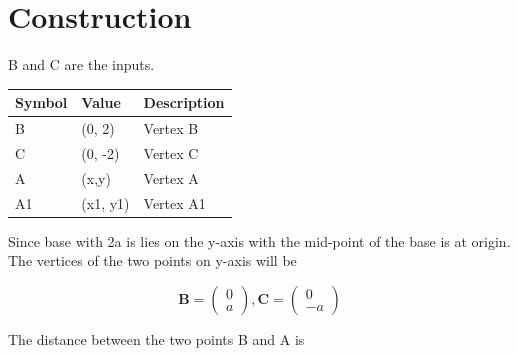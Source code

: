 \documentclass[journal,12pt,twocolumn]{IEEEtran}
\let\vec\mathbf
\newcommand{\myvec}[1]{\ensuremath{\begin{pmatrix}#1\end{pmatrix}}}
\begin{document}
\section{Construction}
B and C are the inputs.
\begin{table}[h]
\centering
\large
\begin{tabular}{|l|l|l|}
\hline
\textbf{Symbol} & \textbf{Value} & \textbf{Description} \\ \hline
B               & (0, 2)         & Vertex B             \\ \hline
C               & (0, -2)        & Vertex C             \\ \hline
A               & (x,y)          & Vertex A             \\ \hline
A1              & (x1, y1)       & Vertex A1            \\ \hline
\end{tabular}
\end{table}

\noindent Since base with 2a is lies on the y-axis with the mid-point of the base is at origin. The vertices of the two points on y-axis will be

\begin{equation}
\vec{B}=\begin{pmatrix} 
0\\
a
\end{pmatrix}, {
\vec{C}=\begin{pmatrix} 
0\\
-a
\end{pmatrix} }
\end{equation}







\noindent The distance between the two points B and A is
\end{document}
